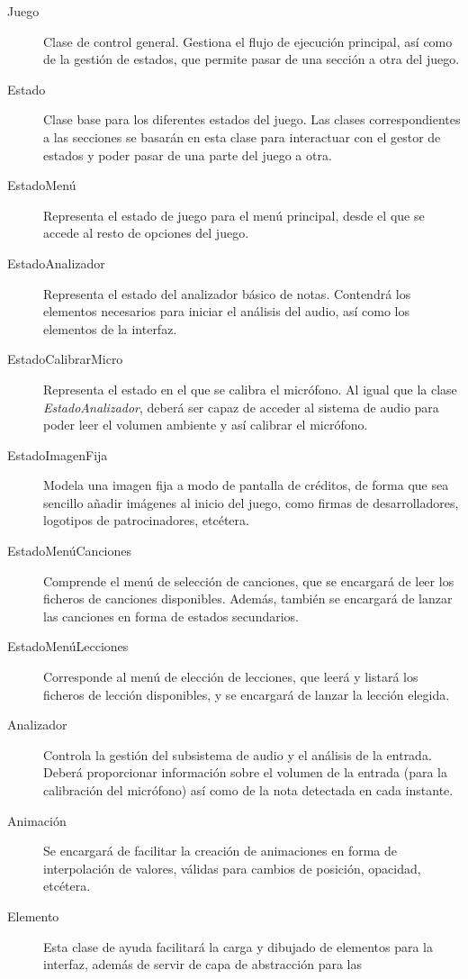 \begin{description}
\item[Juego] Clase de control general. Gestiona el flujo de ejecución principal,
  así como de la gestión de estados, que permite pasar de una sección a otra del
  juego.
\item[Estado] Clase base para los diferentes estados del juego. Las clases
  correspondientes a las secciones se basarán en esta clase para interactuar con
  el gestor de estados y poder pasar de una parte del juego a otra.
\item[EstadoMenú] Representa el estado de juego para el menú principal, desde el
  que se accede al resto de opciones del juego. 
\item[EstadoAnalizador] Representa el estado del analizador básico de
  notas. Contendrá los elementos necesarios para iniciar el análisis del audio,
  así como los elementos de la interfaz.
\item[EstadoCalibrarMicro] Representa el estado en el que se calibra el
  micrófono. Al igual que la clase \textit{EstadoAnalizador}, deberá ser capaz
  de acceder al sistema de audio para poder leer el volumen ambiente y así
  calibrar el micrófono.
\item[EstadoImagenFija] Modela una imagen fija a modo de pantalla de créditos,
  de forma que sea sencillo añadir imágenes al inicio del juego, como firmas de
  desarrolladores, logotipos de patrocinadores, etcétera.
\item[EstadoMenúCanciones] Comprende el menú de selección de canciones, que se
  encargará de leer los ficheros de canciones disponibles. Además, también se
  encargará de lanzar las canciones en forma de estados secundarios.
\item[EstadoMenúLecciones] Corresponde al menú de elección de lecciones, que
  leerá y listará los ficheros de lección disponibles, y se encargará de lanzar
  la lección elegida.
\item[Analizador] Controla la gestión del subsistema de audio y el análisis de
  la entrada. Deberá proporcionar información sobre el volumen de la entrada
  (para la calibración del micrófono) así como de la nota detectada en cada
  instante.
\item[Animación] Se encargará de facilitar la creación de animaciones en forma
  de interpolación de valores, válidas para cambios de posición, opacidad,
  etcétera.
\item[Elemento] Esta clase de ayuda facilitará la carga y dibujado de elementos
  para la interfaz, además de servir de capa de abstracción para las

\end{description}
